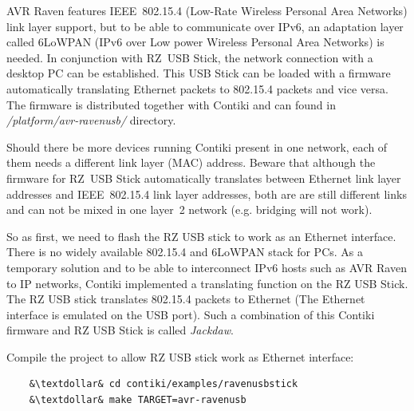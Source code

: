 \documentclass{article}
\begin{document}
AVR Raven features IEEE~802.15.4 (Low-Rate Wireless Personal Area Networks) link layer support,
but to be able to communicate over IPv6, an adaptation layer called
6LoWPAN (IPv6 over Low power Wireless Personal Area Networks) is needed.
In conjunction with RZ~USB Stick, the network connection with a desktop PC can be established.
This USB Stick can be loaded with a firmware automatically translating
Ethernet packets to 802.15.4 packets and vice versa.
The firmware is distributed together with Contiki and
can found in {\it{/platform/avr-ravenusb/}} directory.

Should there be more devices running Contiki present in one network,
each of them needs a different link layer (MAC) address.
Beware that although the firmware for RZ~USB Stick automatically translates
between Ethernet link layer addresses and IEEE~802.15.4 link layer
addresses, both are are still different links and can not be mixed in one
layer~2 network (e.g. bridging will not work).

So as first, we need to flash the RZ USB stick to work as an Ethernet interface.
There is no widely available 802.15.4 and 6LoWPAN stack for PCs.
As a temporary solution and to be able to interconnect IPv6 hosts such as AVR Raven to IP networks,
Contiki implemented a translating function on the RZ USB Stick.
The RZ USB stick translates 802.15.4 packets to Ethernet (The Ethernet interface is emulated on the USB port).
Such a combination of this Contiki firmware and RZ USB Stick is called {\it{Jackdaw}}.

Compile the project to allow RZ USB stick work as Ethernet interface:
\begin{lstlisting}
	&\textdollar& cd contiki/examples/ravenusbstick
	&\textdollar& make TARGET=avr-ravenusb
\end{lstlisting}
\end{document}
